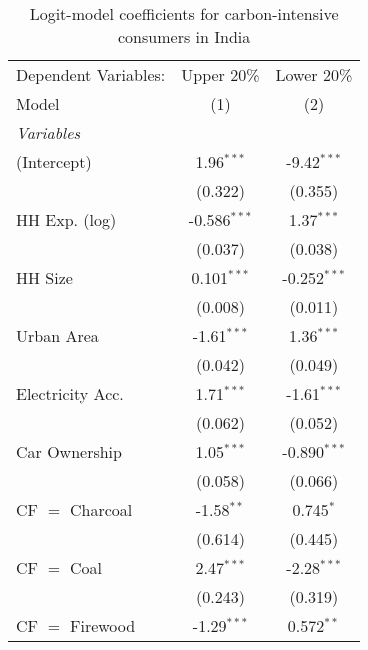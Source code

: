 
\begin{table}[htbp!]
   \centering
   \small
   \begin{adjustbox}{width = 1\textwidth, max height = 0.95\textheight, center}
      \begin{threeparttable}[b]
         \caption{\label{tab:Logit_1_IND} Logit-model coefficients for carbon-intensive consumers in India}
         \begin{tabular}{lcc}
            \tabularnewline \midrule \midrule
            Dependent Variables: & Upper 20\%     & Lower 20\%\\   
            Model                & (1)            & (2)\\  
            \midrule
            \emph{Variables}\\
            (Intercept)          & 1.96$^{***}$   & -9.42$^{***}$\\   
                                 & (0.322)        & (0.355)\\   
            HH Exp. (log)        & -0.586$^{***}$ & 1.37$^{***}$\\   
                                 & (0.037)        & (0.038)\\   
            HH Size              & 0.101$^{***}$  & -0.252$^{***}$\\   
                                 & (0.008)        & (0.011)\\   
            Urban Area           & -1.61$^{***}$  & 1.36$^{***}$\\   
                                 & (0.042)        & (0.049)\\   
            Electricity Acc.     & 1.71$^{***}$   & -1.61$^{***}$\\   
                                 & (0.062)        & (0.052)\\   
            Car Ownership        & 1.05$^{***}$   & -0.890$^{***}$\\   
                                 & (0.058)        & (0.066)\\   
            CF $=$ Charcoal      & -1.58$^{**}$   & 0.745$^{*}$\\   
                                 & (0.614)        & (0.445)\\   
            CF $=$ Coal          & 2.47$^{***}$   & -2.28$^{***}$\\   
                                 & (0.243)        & (0.319)\\   
            CF $=$ Firewood      & -1.29$^{***}$  & 0.572$^{**}$\\   

\end{tabular}
\end{threeparttable}
\end{adjustbox}
\end{table}

